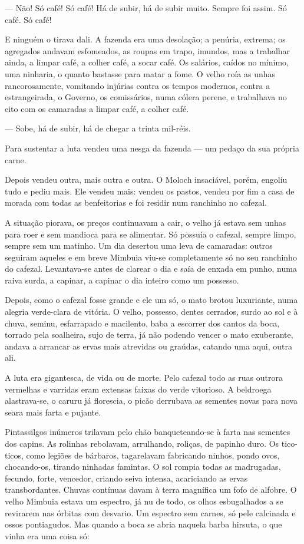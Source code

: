 --- Não! Só café! Só café! Há de subir, há de subir muito. Sempre foi
assim. Só café. Só café!

E ninguém o tirava dali. A fazenda era uma desolação; a penúria,
extrema; os agregados andavam esfomeados, as roupas em trapo, imundos,
mas a trabalhar ainda, a limpar café, a colher café, a socar café. Os
salários, caídos no mínimo, uma ninharia, o quanto bastasse para matar a
fome. O velho roía as unhas rancorosamente, vomitando injúrias contra os
tempos modernos, contra a estrangeirada, o Governo, os comissários, numa
cólera perene, e trabalhava no eito com os camaradas a limpar café, a
colher café.

--- Sobe, há de subir, há de chegar a trinta mil-réis.

Para sustentar a luta vendeu uma nesga da fazenda --- um pedaço da sua
própria carne.

Depois vendeu outra, mais outra e outra. O Moloch insaciável, porém,
engoliu tudo e pediu mais. Ele vendeu mais: vendeu os pastos, vendeu por
fim a casa de morada com todas as benfeitorias e foi residir num
ranchinho no cafezal.

A situação piorava, os preços continuavam a cair, o velho já estava sem
unhas para roer e sem mandioca para se alimentar. Só possuía o cafezal,
sempre limpo, sempre sem um matinho. Um dia desertou uma leva de
camaradas: outros seguiram aqueles e em breve Mimbuia viu-se
completamente só no seu ranchinho do cafezal. Levantava-se antes de
clarear o dia e saía de enxada em punho, numa raiva surda, a capinar, a
capinar o dia inteiro como um possesso.

Depois, como o cafezal fosse grande e ele um só, o mato brotou
luxuriante, numa alegria verde-clara de vitória. O velho, possesso,
dentes cerrados, surdo ao sol e à chuva, seminu, esfarrapado e
macilento, baba a escorrer dos cantos da boca, torrado pela soalheira,
sujo de terra, já não podendo vencer o mato exuberante, andava a
arrancar as ervas mais atrevidas ou graúdas, catando uma aqui, outra
ali.

A luta era gigantesca, de vida ou de morte. Pelo cafezal todo as ruas
outrora vermelhas e varridas eram extensas faixas do verde vitorioso. A
beldroega alastrava-se, o caruru já florescia, o picão derrubava as
sementes novas para nova seara mais farta e pujante.

Pintassilgos inúmeros trilavam pelo chão banqueteando-se à farta nas
sementes dos capins. As rolinhas rebolavam, arrulhando, roliças, de
papinho duro. Os tico-ticos, como legiões de bárbaros, tagarelavam
fabricando ninhos, pondo ovos, chocando-os, tirando ninhadas famintas. O
sol rompia todas as madrugadas, fecundo, forte, vencedor, criando seiva
intensa, acariciando as ervas transbordantes. Chuvas contínuas davam à
terra magnífica um fofo de alfobre. O velho Mimbuia estava um espectro,
já nu de todo, os olhos esbugalhados a se revirarem nas órbitas com
desvario. Um espectro sem carnes, só pele calcinada e ossos pontiagudos.
Mas quando a boca se abria naquela barba hirsuta, o que vinha era uma
coisa só:

